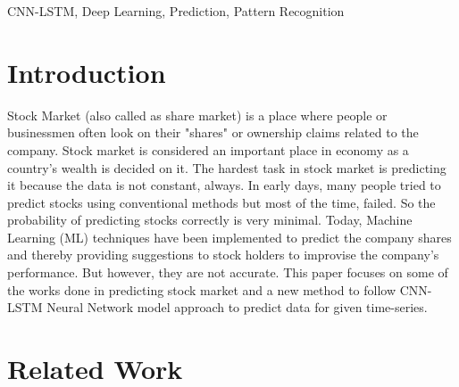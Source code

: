 \documentclass[conference]{IEEEtran}
\begin{document}
\begin{IEEEkeywords}
CNN-LSTM, Deep Learning, Prediction, Pattern Recognition
\end{IEEEkeywords}

\section{Introduction}
Stock Market (also called as share market) is a place where people or businessmen often look on their "shares" or ownership claims related to the company. Stock market is considered an important place in economy as a country's wealth is decided on it. The hardest task in stock market is predicting it because the data is not constant, always. In early days, many people tried to predict stocks using conventional methods but most of the time, failed. So the probability of predicting stocks correctly is very minimal. Today, Machine Learning (ML) techniques have been implemented to predict the company shares and thereby providing suggestions to stock holders to improvise the company's performance. But however, they are not accurate. This paper focuses on some of the works done in predicting stock market and a new method to follow CNN-LSTM Neural Network model approach to predict data for given time-series.

\section{Related Work}
\end{document}
